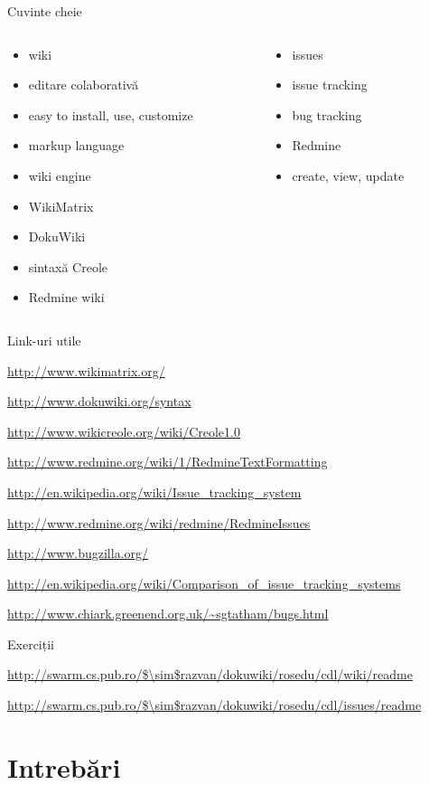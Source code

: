 \documentclass{beamer}
\begin{document}
\begin{frame}{Cuvinte cheie}
  \begin{columns}
    \begin{column}[l]{0.5\textwidth}
      \begin{itemize}
        \item wiki
        \item editare colaborativă
        \item easy to install, use, customize
        \item markup language
        \item wiki engine
        \item WikiMatrix
        \item DokuWiki
        \item sintaxă Creole
        \item Redmine wiki
      \end{itemize}
    \end{column}
    \begin{column}[l]{0.5\textwidth}
      \begin{itemize}
        \item issues
        \item issue tracking
        \item bug tracking
        \item Redmine
        \item create, view, update
      \end{itemize}
    \end{column}
  \end{columns}
\end{frame}

\begin{frame}{Link-uri utile}
  \begin{itemize}
    {\footnotesize
    \item \url{http://www.wikimatrix.org/}
    \item \url{http://www.dokuwiki.org/syntax}
    \item \url{http://www.wikicreole.org/wiki/Creole1.0}
    \item \url{http://www.redmine.org/wiki/1/RedmineTextFormatting}
    \item \url{http://en.wikipedia.org/wiki/Issue\_tracking\_system}
    \item \url{http://www.redmine.org/wiki/redmine/RedmineIssues}
    \item \url{http://www.bugzilla.org/}
    \item
\url{http://en.wikipedia.org/wiki/Comparison\_of\_issue\_tracking\_systems}
    \item \url{http://www.chiark.greenend.org.uk/~sgtatham/bugs.html}
    }
  \end{itemize}
\end{frame}

\begin{frame}{Exerciții}
  \begin{itemize}
    {\footnotesize
    \item \url{http://swarm.cs.pub.ro/$\sim$razvan/dokuwiki/rosedu/cdl/wiki/readme}
    \item \url{http://swarm.cs.pub.ro/$\sim$razvan/dokuwiki/rosedu/cdl/issues/readme}
    }
  \end{itemize}
\end{frame}

\section{Intrebări}
\end{document}

